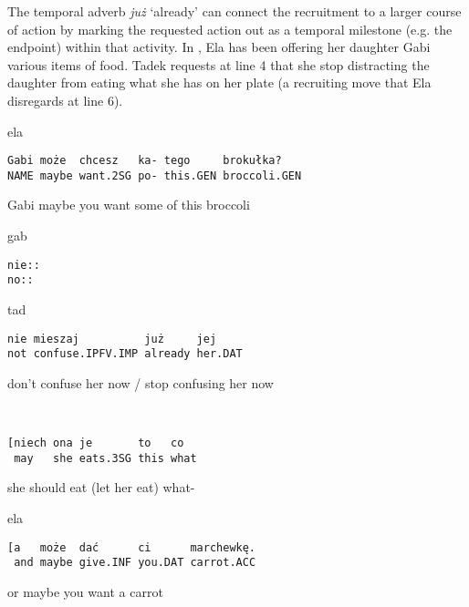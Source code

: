 \documentclass[output=paper]{langsci/langscibook}
\begin{document}
The temporal adverb \textit{już} `already' can connect the recruitment to a larger course of action by marking the requested action out as a temporal milestone (e.g. the endpoint) within that activity.  In , Ela has been offering her daughter Gabi various items of food.  Tadek requests at line 4 that she stop distracting the daughter from eating what she has on her plate (a recruiting move that Ela disregards at line 6).

\vspace{2mm}
%
\begin{transbox}{1}{ela}
\begin{verbatim}
Gabi może  chcesz   ka- tego     brokułka?
NAME maybe want.2SG po- this.GEN broccoli.GEN
\end{verbatim}
Gabi maybe you want some of this broccoli
\end{transbox}
%
%
\begin{transbox}{3}{gab}
\begin{verbatim}
nie::
no::
\end{verbatim}
\end{transbox}
%
\begin{mdframednoverticalspace}[style=firstfoc]
\begin{transbox}{4}{tad}
\begin{verbatim}
nie mieszaj          już     jej
not confuse.IPFV.IMP already her.DAT
\end{verbatim}
don’t confuse her now / stop confusing her now
\end{transbox}
\end{mdframednoverticalspace}
%
\begin{mdframednoverticalspace}[style=firstfoc]
\begin{transbox}{5}{~}
\begin{verbatim}
[niech ona je       to   co
 may   she eats.3SG this what
\end{verbatim}
\hspace{0.07cm} she should eat (let her eat) what-
\end{transbox}
\end{mdframednoverticalspace}
%
\begin{mdframednoverticalspace}[style=secondfoc]
\begin{transbox}{6}{ela}
\begin{verbatim}
[a   może  dać      ci      marchewkę.
 and maybe give.INF you.DAT carrot.ACC
\end{verbatim}
\hspace{0.07cm} or maybe you want a carrot
\end{transbox}
\end{mdframednoverticalspace}
\end{document}
